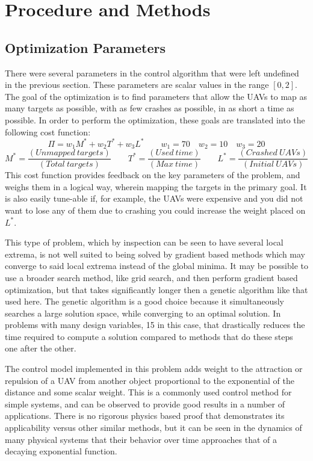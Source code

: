 \documentclass[a4paper,12pt]{report}
\begin{document}
\section{Procedure and Methods}
\subsection{Optimization Parameters}
There were several parameters in the control algorithm that were left undefined in the previous section. These parameters are scalar values in the range $[0, 2]$. The goal of the optimization is to find parameters that allow the UAVs to map as many targets as possible, with as few crashes as possible, in as short a time as possible. In order to perform the optimization, these goals are translated into the following cost function:
$$\Pi = w_1M^* + w_2T^* + w_3L^* \qquad w_1 = 70 \quad w_2 = 10 \quad w_3 = 20$$
$$ M^* = \frac{(Unmapped\ targets)}{(Total\ targets)} \qquad T^* = \frac{(Used\ time)}{(Max\ time)} \qquad L^* = \frac{(Crashed\ UAVs)}{(Initial\ UAVs)}$$
This cost function provides feedback on the key parameters of the problem, and weighs them in a logical way, wherein mapping the targets in the primary goal. It is also easily tune-able if, for example, the UAVs were expensive and you did not want to lose any of them due to crashing you could increase the weight placed on $L^*$.

This type of problem, which by inspection can be seen to have several local extrema, is not well suited to being solved by gradient based methods which may converge to said local extrema instead of the global minima. It may be possible to use a broader search method, like grid search, and then perform gradient based optimization, but that takes significantly longer then a genetic algorithm like that used here. The genetic algorithm is a good choice because it simultaneously searches a large solution space, while converging to an optimal solution. In problems with many design variables, 15 in this case, that drastically reduces the time required to compute a solution compared to methods that do these steps one after the other.

The control model implemented in this problem adds weight to the attraction or repulsion of a UAV from another object proportional to the exponential of the distance and some scalar weight. This is a commonly used control method for simple systems, and can be observed to provide good results in a number of applications. There is no rigorous physics based proof that demonstrates its applicability versus other similar methods, but it can be seen in the dynamics of many physical systems that their behavior over time approaches that of a decaying exponential function.
\end{document}
